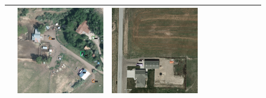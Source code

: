 \begin{figure}[h!]
\begin{tabularx}{\textwidth}{c|*{9}{X}}
    & \includegraphics[trim={740pt 420pt 180pt 510pt},clip,width=\linewidth]{images/015Results/01abb_vs_obb/comp_images/aab_old/523.png}
    & \includegraphics[trim={300pt 355pt 610pt 570pt},clip,width=\linewidth]{images/015Results/01abb_vs_obb/comp_images/aab_old/198.png} \\ \hline

\end{tabularx}
\end{figure}

